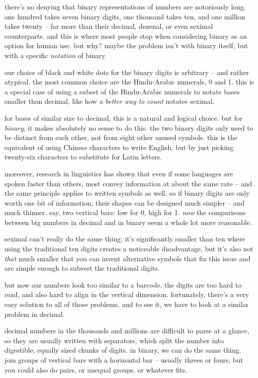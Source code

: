 \documentclass[../best.tex]{subfiles}
\begin{document}

there's no denying that binary representations of numbers are notoriously long. one hundred takes seven binary digits, one thousand takes ten, and one million takes twenty -- far more than their decimal, dozenal, or even seximal counterparts. and this is where most people stop when considering binary as an option for human use. but why? maybe the problem isn't with binary itself, but with a specific \emph{notation} of binary.

our choice of black and white dots for the binary digits is arbitrary -- and rather atypical. the most common choice are the Hindu-Arabic numerals, 0 and 1. this is a special case of using a subset of the Hindu-Arabic numerals to notate bases smaller than decimal, like how {\it a better way to count} notates seximal.

for bases of similar size to decimal, this is a natural and logical choice. but for \emph{binary}, it makes absolutely no sense to do this. the two binary digits only need to be distinct from each other, not from eight other unused symbols. this is the equivalent of using Chinese characters to write English, but by just picking twenty-six characters to substitute for Latin letters.

moreover, research in linguistics has shown that even if some languages are spoken faster than others, most convey information at about the same rate -- and the same principle applies to written symbols as well.\myfootnote{} so if binary digits are only worth one bit of information, their shapes can be designed much simpler -- and much thinner. say, two vertical bars: low for 0, high for 1. \emph{now} the comparisons between big numbers in decimal and in binary seem a whole lot more reasonable.

seximal can't really do the same thing: it's significantly smaller than ten where using the traditional ten digits creates a noticeable disadvantage, but it's also not \emph{that} much smaller that you can invent alternative symbols that fix this issue and are simple enough to subvert the traditional digits.\myfootnote{}

but now our numbers look too similar to a barcode. the digits are too hard to read, and also hard to align in the vertical dimension. fortunately, there's a very easy solution to all of those problems, and to see it, we have to look at a similar problem in decimal.

decimal numbers in the thousands and millions are difficult to parse at a glance, so they are usually written with separators, which split the number into digestible, equally sized chunks of digits. in binary, we can do the same thing. join groups of vertical bars with a horizontal bar -- usually threes or fours, but you could also do pairs, or unequal groups, or whatever fits.\myfootnote{}
\end{document}
